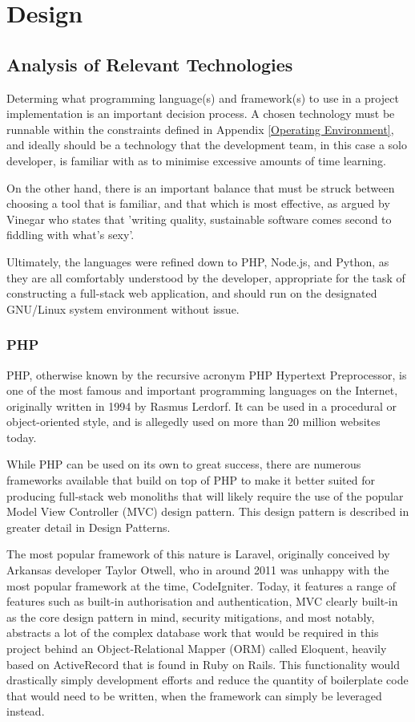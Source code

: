 \chapter{Design}

\section{Analysis of Relevant Technologies}
Determing what programming language(s) and framework(s) to use in a project implementation is an important decision process. A chosen technology must be runnable within the constraints defined in Appendix \ref{Operating Environment}, and ideally should be a technology that the development team, in this case a solo developer, is familiar with as to minimise excessive amounts of time learning.

On the other hand, there is an important balance that must be struck between choosing a tool that is familiar, and that which is most effective, as argued by Vinegar who states that 'writing quality, sustainable software comes second to fiddling with what's sexy'. \cite{Vinegar1}

Ultimately, the languages were refined down to PHP, Node.js, and Python, as they are all comfortably understood by the developer, appropriate for the task of constructing a full-stack web application, and should run on the designated GNU/Linux system environment without issue.

\subsection{PHP}
PHP, otherwise known by the recursive acronym PHP Hypertext Preprocessor, is one of the most famous and important programming languages on the Internet, originally written in 1994 by Rasmus Lerdorf. It can be used in a procedural or object-oriented style, and is allegedly used on more than 20 million websites today. \cite{Wolfe1}

While PHP can be used on its own to great success, there are numerous frameworks available that build on top of PHP to make it better suited for producing full-stack web monoliths that will likely require the use of the popular Model View Controller (MVC) design pattern. This design pattern is described in greater detail in Design Patterns.

The most popular framework of this nature is Laravel, originally conceived by Arkansas developer Taylor Otwell, who in around 2011 was unhappy with the most popular framework at the time, CodeIgniter. \cite{OBrien1} Today, it features a range of features such as built-in authorisation and authentication, MVC clearly built-in as the core design pattern in mind, security mitigations, and most notably, abstracts a lot of the complex database work that would be required in this project behind an Object-Relational Mapper (ORM) called Eloquent, heavily based on ActiveRecord that is found in Ruby on Rails. This functionality would drastically simply development efforts and reduce the quantity of boilerplate code that would need to be written, when the framework can simply be leveraged instead. \cite{Shah1} \cite{Laravel1}

